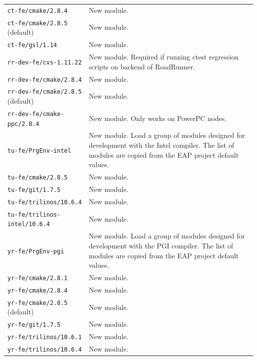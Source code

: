 \documentclass[note]{ResearchNote_pdf}
\newcommand{\tableText}[1]{{\raggedright #1}}
\begin{document}
\begin{table}[!ht]
\begin{center}
\begin{tabular}{lp{3in}}
      \hline %

      \texttt{ct-fe/cmake/2.8.4} & \tableText{New module.} \\
      \texttt{ct-fe/cmake/2.8.5} (default) & \tableText{New module.} \\
      \texttt{ct-fe/gsl/1.14} & \tableText{New module.} \\

      \hline %
      \texttt{rr-dev-fe/cvs-1.11.22} & \tableText{New module.
        Required if running ctest regression scripts on backend of
        RoadRunner.} \\ 
      \texttt{rr-dev-fe/cmake/2.8.4} & \tableText{New module.} \\
      \texttt{rr-dev-fe/cmake/2.8.5} (default) & \tableText{New module.} \\
      \texttt{rr-dev-fe/cmake-ppc/2.8.4} & \tableText{New module. Only
      works on PowerPC nodes.} \\

      \hline %

      \texttt{tu-fe/PrgEnv-intel} & \tableText{New module. Load a
        group of modules designed for development with the Intel
        compiler.  The list of modules are copied from the EAP project
        default values. } \\

      \texttt{tu-fe/cmake/2.8.5} & \tableText{New module.} \\
      \texttt{tu-fe/git/1.7.5} & \tableText{New module.} \\
      \texttt{tu-fe/trilinos/10.6.4} & \tableText{New module.} \\
      \texttt{tu-fe/trilinos-intel/10.6.4} & \tableText{New module.} \\

      \hline %


      \texttt{yr-fe/PrgEnv-pgi} & \tableText{New module. Load a group
        of modules designed for development with the PGI compiler.
        The list of modules are copied from the EAP project default
        values. } \\

      \texttt{yr-fe/cmake/2.8.1} & \tableText{New module.} \\
      \texttt{yr-fe/cmake/2.8.4} & \tableText{New module.} \\
      \texttt{yr-fe/cmake/2.8.5} (default) & \tableText{New module.} \\
      \texttt{yr-fe/git/1.7.5} & \tableText{New module.} \\
      \texttt{yr-fe/trilinos/10.6.1} & \tableText{New module.} \\
      \texttt{yr-fe/trilinos/10.6.4} & \tableText{New module.} \\

      \hline\hline
    \end{tabular}
  \end{center}
\end{table}
\end{document}
